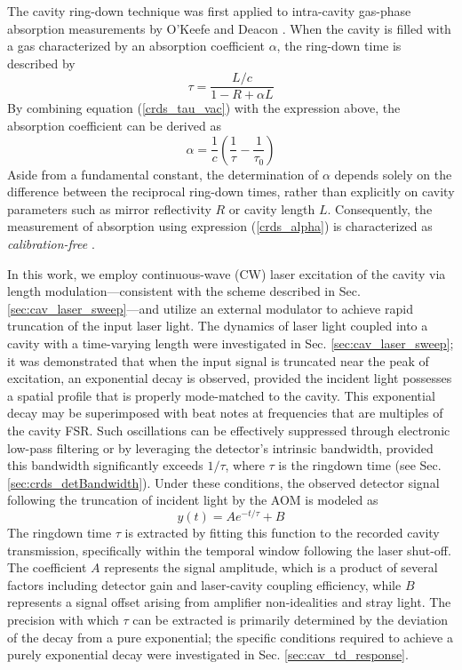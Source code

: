 \documentclass[8pt,a4paper]{report}
\begin{document}
	The cavity ring-down technique was first applied to intra-cavity gas-phase absorption measurements by O'Keefe and Deacon \cite{book_crds, crds_first_okeefe}. When the cavity is filled with a gas characterized by an absorption coefficient $\alpha$, the ring-down time is described by
	\begin{equation} \label{crds_tau}
		\tau = \frac{L/c}{1-R + \alpha L}
	\end{equation}
	By combining equation (\ref{crds_tau_vac}) with the expression above, the absorption coefficient can be derived as
	\begin{equation} \label{crds_alpha}
		\alpha = \frac{1}{c}\left(\frac{1}{\tau} - \frac{1}{\tau_0}\right)
	\end{equation}
	Aside from a fundamental constant, the determination of $\alpha$ depends solely on the difference between the reciprocal ring-down times, rather than explicitly on cavity parameters such as mirror reflectivity $R$ or cavity length $L$. Consequently, the measurement of absorption using expression (\ref{crds_alpha}) is characterized as \textit{calibration-free} \cite{crds_quantitative}.
	
	In this work, we employ continuous-wave (CW) laser excitation of the cavity via length modulation—consistent with the scheme described in Sec. \ref{sec:cav_laser_sweep}—and utilize an external modulator to achieve rapid truncation of the input laser light. The dynamics of laser light coupled into a cavity with a time-varying length were investigated in Sec. \ref{sec:cav_laser_sweep}; it was demonstrated that when the input signal is truncated near the peak of excitation, an exponential decay is observed, provided the incident light possesses a spatial profile that is properly mode-matched to the cavity. This exponential decay may be superimposed with beat notes at frequencies that are multiples of the cavity FSR. Such oscillations can be effectively suppressed through electronic low-pass filtering or by leveraging the detector's intrinsic bandwidth, provided this bandwidth significantly exceeds $1/\tau$, where $\tau$ is the ringdown time (see Sec. \ref{sec:crds_detBandwidth}). Under these conditions, the observed detector signal following the truncation of incident light by the AOM is modeled as
	\begin{equation} \label{crds_model_exponential}
		y(t) = Ae^{-t/\tau} + B
	\end{equation}
	The ringdown time $\tau$ is extracted by fitting this function to the recorded cavity transmission, specifically within the temporal window following the laser shut-off. The coefficient $A$ represents the signal amplitude, which is a product of several factors including detector gain and laser-cavity coupling efficiency, while $B$ represents a signal offset arising from amplifier non-idealities and stray light. The precision with which $\tau$ can be extracted is primarily determined by the deviation of the decay from a pure exponential; the specific conditions required to achieve a purely exponential decay were investigated in Sec. \ref{sec:cav_td_response}.
	
\end{document}
